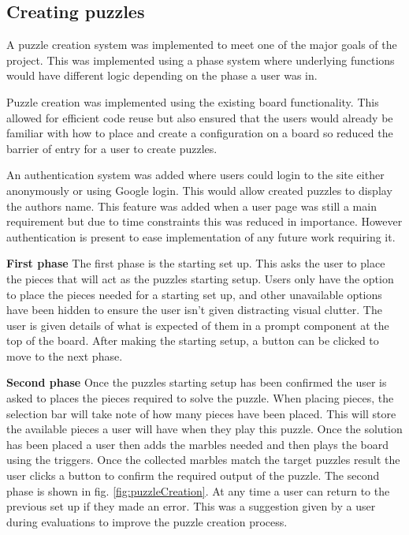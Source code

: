 \documentclass{l4proj}
\begin{document}
\subsection{Creating puzzles}
A puzzle creation system was implemented to meet one of the major goals of the project. This was implemented using a phase system where underlying functions would have different logic depending on the phase a user was in. 

Puzzle creation was implemented using the existing board functionality. This allowed for efficient code reuse but also ensured that the users would already be familiar with how to place and create a configuration on a board so reduced the barrier of entry for a user to create puzzles.

An authentication system was added where users could login to the site either anonymously or using Google login. This would allow created puzzles to display the authors name. This feature was added when a user page was still a main requirement but due to time constraints this was reduced in importance. However authentication is present to ease implementation of any future work requiring it.

\textbf{First phase}
The first phase is the starting set up. This asks the user to place the pieces that will act as the puzzles starting setup. Users only have the option to place the pieces needed for a starting set up, and other unavailable options have been hidden to ensure the user isn't given distracting visual clutter. The user is given details of what is expected of them in a prompt component at the top of the board. After making the starting setup, a button can be clicked to move to the next phase. 

\textbf{Second phase}
Once the puzzles starting setup has been confirmed the user is asked to places the pieces required to solve the puzzle. When placing pieces, the selection bar will take note of how many pieces have been placed. This will store the available pieces a user will have when they play this puzzle. Once the solution has been placed a user then adds the marbles needed and then plays the board using the triggers. Once the collected marbles match the target puzzles result the user clicks a button to confirm the required output of the puzzle. The second phase is shown in fig. \ref{fig:puzzleCreation}. At any time a user can return to the previous set up if they made an error. This was a suggestion given by a user during evaluations to improve the puzzle creation process.
\end{document}
